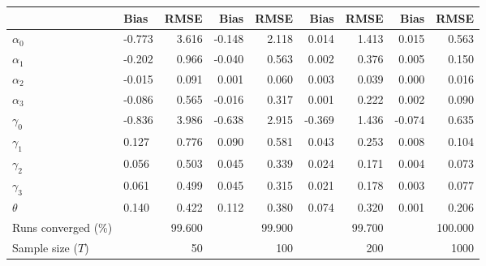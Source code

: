 
\begin{tabular}[t]{llrrrrrrr}
\toprule
  & Bias & RMSE & Bias & RMSE & Bias & RMSE & Bias & RMSE\\
\midrule
$\alpha_{0}$ & -0.773 & 3.616 & -0.148 & 2.118 & 0.014 & 1.413 & 0.015 & 0.563\\
$\alpha_{1}$ & -0.202 & 0.966 & -0.040 & 0.563 & 0.002 & 0.376 & 0.005 & 0.150\\
$\alpha_{2}$ & -0.015 & 0.091 & 0.001 & 0.060 & 0.003 & 0.039 & 0.000 & 0.016\\
$\alpha_{3}$ & -0.086 & 0.565 & -0.016 & 0.317 & 0.001 & 0.222 & 0.002 & 0.090\\
$\gamma_{0}$ & -0.836 & 3.986 & -0.638 & 2.915 & -0.369 & 1.436 & -0.074 & 0.635\\
$\gamma_{1}$ & 0.127 & 0.776 & 0.090 & 0.581 & 0.043 & 0.253 & 0.008 & 0.104\\
$\gamma_{2}$ & 0.056 & 0.503 & 0.045 & 0.339 & 0.024 & 0.171 & 0.004 & 0.073\\
$\gamma_{3}$ & 0.061 & 0.499 & 0.045 & 0.315 & 0.021 & 0.178 & 0.003 & 0.077\\
$\theta$ & 0.140 & 0.422 & 0.112 & 0.380 & 0.074 & 0.320 & 0.001 & 0.206\\
Runs converged (\%) &  & 99.600 &  & 99.900 &  & 99.700 &  & 100.000\\
Sample size ($T$) &  & 50 &  & 100 &  & 200 &  & 1000\\
\bottomrule
\end{tabular}
